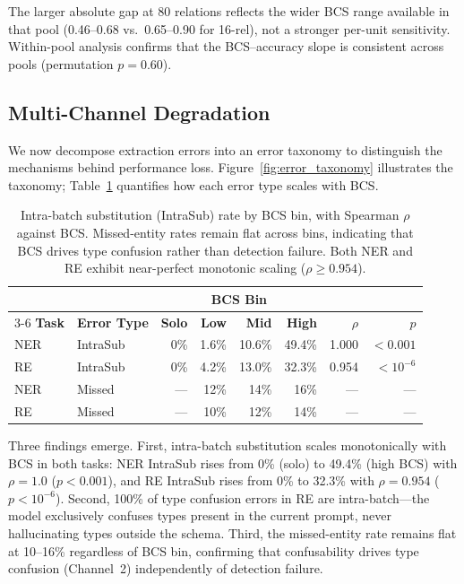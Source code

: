 The larger absolute gap at 80 relations reflects the wider BCS range available in that pool (0.46--0.68 vs.\ 0.65--0.90 for 16-rel), not a stronger per-unit sensitivity. Within-pool analysis confirms that the BCS--accuracy slope is consistent across pools (permutation $p = 0.60$).

\subsection{Multi-Channel Degradation}
\label{sec:multi_channel}

We now decompose extraction errors into an error taxonomy to distinguish the mechanisms behind performance loss. Figure~\ref{fig:error_taxonomy} illustrates the taxonomy; Table~\ref{tab:error_taxonomy} quantifies how each error type scales with BCS.

\begin{table}[t]
\centering
\small
\begin{tabular}{llrrrrrr}
\toprule
 & & \multicolumn{4}{c}{\textbf{BCS Bin}} & & \\
\cmidrule(lr){3-6}
\textbf{Task} & \textbf{Error Type} & \textbf{Solo} & \textbf{Low} & \textbf{Mid} & \textbf{High} & \textbf{$\rho$} & \textbf{$p$} \\
\midrule
NER & IntraSub & 0\% & 1.6\% & 10.6\% & 49.4\% & 1.000 & ${<}0.001$ \\
RE  & IntraSub & 0\% & 4.2\% & 13.0\% & 32.3\% & 0.954 & ${<}10^{-6}$ \\
\midrule
NER & Missed & --- & 12\% & 14\% & 16\% & --- & --- \\
RE  & Missed & --- & 10\% & 12\% & 14\% & --- & --- \\
\bottomrule
\end{tabular}
\caption{Intra-batch substitution (IntraSub) rate by BCS bin, with Spearman $\rho$ against BCS. Missed-entity rates remain flat across bins, indicating that BCS drives type confusion rather than detection failure. Both NER and RE exhibit near-perfect monotonic scaling ($\rho \geq 0.954$).}
\label{tab:error_taxonomy}
\end{table}

Three findings emerge. First, intra-batch substitution scales monotonically with BCS in both tasks: NER IntraSub rises from 0\% (solo) to 49.4\% (high BCS) with $\rho = 1.0$ ($p < 0.001$), and RE IntraSub rises from 0\% to 32.3\% with $\rho = 0.954$ ($p < 10^{-6}$). Second, 100\% of type confusion errors in RE are intra-batch---the model exclusively confuses types present in the current prompt, never hallucinating types outside the schema. Third, the missed-entity rate remains flat at 10--16\% regardless of BCS bin, confirming that confusability drives type confusion (Channel~2) independently of detection failure.

